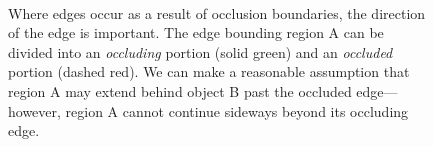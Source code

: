 \documentclass[10pt,twocolumn,letterpaper]{article}
\newcommand{\point}{\mathbf{p}}
\begin{document}
\begin{figure}
    \centering 
        \hfill
     \\
    \caption{Where edges occur as a result of occlusion boundaries, the direction of the edge is important. The edge bounding region A can be divided into an \emph{occluding} portion (solid green) and an \emph{occluded} portion (dashed red).
    We can make a reasonable assumption that region A may extend behind object B past the occluded edge---however, region A cannot continue sideways beyond its occluding edge.}
    \label{fig:occluded_region}
\end{figure}


\end{document}
